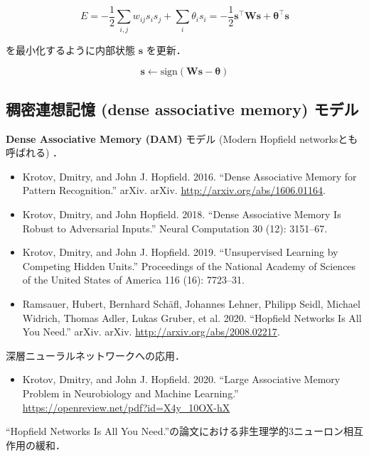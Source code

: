 \begin{equation}
E=-{\frac 12}\sum _{{i,j}}{w_{{ij}}{s_{i}}{s_{j}}}+\sum _{i}{\theta _{i}}{s_{i}}=-{\frac 12}\mathbf{s}^\top\mathbf{W}\mathbf{s}+\mathbf{\theta}^\top\mathbf{s}
\end{equation}


を最小化するように内部状態 $\mathbf{s}$ を更新．


\begin{equation}
\mathbf{s}\leftarrow \text{sign}\left(\mathbf{W}\mathbf{s}-\mathbf{\theta}\right)
\end{equation}




\subsection{稠密連想記憶 (dense associative memory) モデル}
\textbf{Dense Associative Memory (DAM)} モデル (Modern Hopfield networksとも呼ばれる) ．

\begin{itemize}
\item Krotov, Dmitry, and John J. Hopfield. 2016. “Dense Associative Memory for Pattern Recognition.” arXiv. arXiv. \url{http://arxiv.org/abs/1606.01164}.
\item Krotov, Dmitry, and John Hopfield. 2018. “Dense Associative Memory Is Robust to Adversarial Inputs.” Neural Computation 30 (12): 3151–67.
\item Krotov, Dmitry, and John J. Hopfield. 2019. “Unsupervised Learning by Competing Hidden Units.” Proceedings of the National Academy of Sciences of the United States of America 116 (16): 7723–31.
\end{itemize}


\begin{itemize}
\item Ramsauer, Hubert, Bernhard Schäfl, Johannes Lehner, Philipp Seidl, Michael Widrich, Thomas Adler, Lukas Gruber, et al. 2020. “Hopfield Networks Is All You Need.” arXiv. arXiv. \url{http://arxiv.org/abs/2008.02217}.
\end{itemize}

深層ニューラルネットワークへの応用．


\begin{itemize}
\item Krotov, Dmitry, and John J. Hopfield. 2020. “Large Associative Memory Problem in Neurobiology and Machine Learning.” \url{https://openreview.net/pdf?id=X4y_10OX-hX}
\end{itemize}

“Hopfield Networks Is All You Need.”の論文における非生理学的3ニューロン相互作用の緩和．
